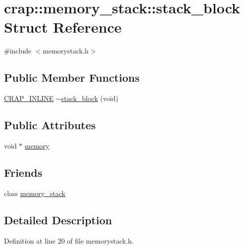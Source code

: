 \hypertarget{structcrap_1_1memory__stack_1_1stack__block}{\section{crap\+:\+:memory\+\_\+stack\+:\+:stack\+\_\+block Struct Reference}
\label{structcrap_1_1memory__stack_1_1stack__block}
}


{\ttfamily \#include $<$memorystack.\+h$>$}

\subsection*{Public Member Functions}
\begin{DoxyCompactItemize}
\item 
\hyperlink{config__x86_8h_a5a40526b8d842e7ff731509998bb0f1c}{C\+R\+A\+P\+\_\+\+I\+N\+L\+I\+N\+E} \hyperlink{structcrap_1_1memory__stack_1_1stack__block_aa066e125b0ec790abc0ef1698266c734}{$\sim$stack\+\_\+block} (void)
\end{DoxyCompactItemize}
\subsection*{Public Attributes}
\begin{DoxyCompactItemize}
\item 
void $\ast$ \hyperlink{structcrap_1_1memory__stack_1_1stack__block_a8c47af0e38c75271a11e2b29f963cc99}{memory}
\end{DoxyCompactItemize}
\subsection*{Friends}
\begin{DoxyCompactItemize}
\item 
class \hyperlink{structcrap_1_1memory__stack_1_1stack__block_a290fed5bdf739cd689a3119b9104965e}{memory\+\_\+stack}
\end{DoxyCompactItemize}


\subsection{Detailed Description}


Definition at line 20 of file memorystack.\+h.




